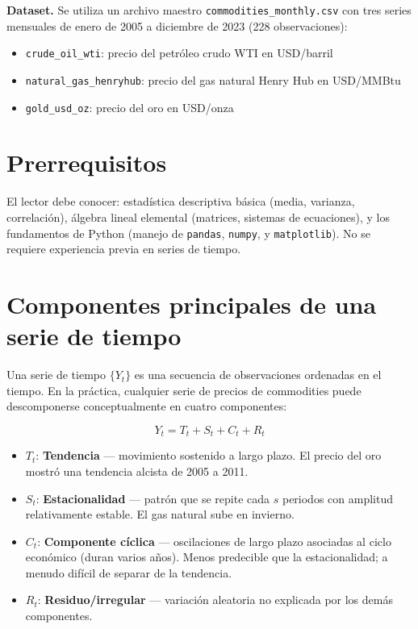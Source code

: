 \documentclass[12pt,a4paper]{article}
\theoremstyle{definition}
\begin{document}
\medskip
\noindent\textbf{Dataset.} Se utiliza un archivo maestro \texttt{commodities\_monthly.csv}
con tres series mensuales de enero de 2005 a diciembre de 2023 (228 observaciones):
\begin{itemize}[nosep]
  \item \texttt{crude\_oil\_wti}: precio del petróleo crudo WTI en USD/barril
  \item \texttt{natural\_gas\_henryhub}: precio del gas natural Henry Hub en USD/MMBtu
  \item \texttt{gold\_usd\_oz}: precio del oro en USD/onza
\end{itemize}

\section{Prerrequisitos}

El lector debe conocer: estadística descriptiva básica (media, varianza,
correlación), álgebra lineal elemental (matrices, sistemas de ecuaciones), y los
fundamentos de Python (manejo de \texttt{pandas}, \texttt{numpy}, y
\texttt{matplotlib}). No se requiere experiencia previa en series de tiempo.

\section{Componentes principales de una serie de tiempo}

Una serie de tiempo $\{Y_t\}$ es una secuencia de observaciones ordenadas en el
tiempo. En la práctica, cualquier serie de precios de commodities puede
descomponerse conceptualmente en cuatro componentes:

\begin{defbox}
\[
  Y_t = T_t + S_t + C_t + R_t
\]
\begin{itemize}[nosep]
  \item $T_t$: \textbf{Tendencia} --- movimiento sostenido a largo plazo.
        El precio del oro mostró una tendencia alcista de 2005 a 2011.
  \item $S_t$: \textbf{Estacionalidad} --- patrón que se repite cada $s$ periodos
        con amplitud relativamente estable. El gas natural sube en invierno.
  \item $C_t$: \textbf{Componente cíclica} --- oscilaciones de largo plazo
        asociadas al ciclo económico (duran varios años). Menos predecible que
        la estacionalidad; a menudo difícil de separar de la tendencia.
  \item $R_t$: \textbf{Residuo/irregular} --- variación aleatoria no explicada
        por los demás componentes.
\end{itemize}
\end{defbox}
\end{document}
